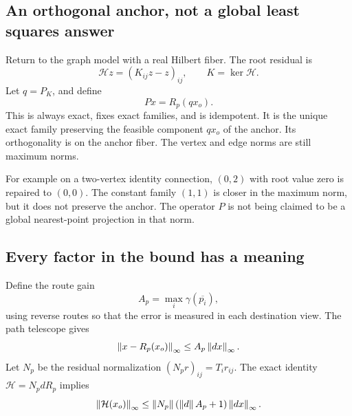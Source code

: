 
\label{sec:holonomyrepair}
\subsection{An orthogonal anchor, not a global least squares answer}
Return to the graph model with a real Hilbert fiber. The root residual is
\[
 \mathcal H z=(K_{ij}z-z)_{ij},\qquad K=\ker\mathcal H.
\]
Let \(q=P_K\), and define
\[
 Px=R_p(qx_o).
\]
This is always exact, fixes exact families, and is idempotent. It is the unique exact family preserving the feasible component \(qx_o\) of the anchor. Its orthogonality is on the anchor fiber. The vertex and edge norms are still maximum norms.

For example on a two-vertex identity connection, \((0,2)\) with root value zero is repaired to \((0,0)\). The constant family \((1,1)\) is closer in the maximum norm, but it does not preserve the anchor. The operator \(P\) is not being claimed to be a global nearest-point projection in that norm.

\subsection{Every factor in the bound has a meaning}
Define the route gain
\[
 A_p=\max_i\gamma(\overline{p_i}),
\]
using reverse routes so that the error is measured in each destination view. The path telescope gives
\[
 \left\lVert x-R_p(x_o)\right\rVert_\infty\le A_p\left\lVert dx\right\rVert_\infty.
\]
Let \(N_p\) be the residual normalization \((N_pr)_{ij}=T_ir_{ij}\). The exact identity \(\mathcal H=N_pdR_p\) implies
\[
 \left\lVert\mathcal H(x_o)\right\rVert_\infty
 \le\left\lVert N_p\right\rVert(\left\lVert d\right\rVert A_p+1)\left\lVert dx\right\rVert_\infty.
\]

